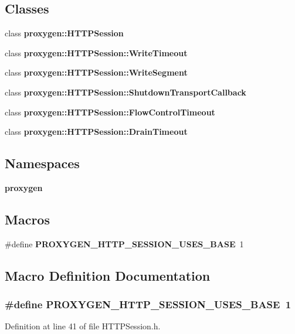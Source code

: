 \subsection*{Classes}
\begin{DoxyCompactItemize}
\item 
class {\bf proxygen\+::\+H\+T\+T\+P\+Session}
\item 
class {\bf proxygen\+::\+H\+T\+T\+P\+Session\+::\+Write\+Timeout}
\item 
class {\bf proxygen\+::\+H\+T\+T\+P\+Session\+::\+Write\+Segment}
\item 
class {\bf proxygen\+::\+H\+T\+T\+P\+Session\+::\+Shutdown\+Transport\+Callback}
\item 
class {\bf proxygen\+::\+H\+T\+T\+P\+Session\+::\+Flow\+Control\+Timeout}
\item 
class {\bf proxygen\+::\+H\+T\+T\+P\+Session\+::\+Drain\+Timeout}
\end{DoxyCompactItemize}
\subsection*{Namespaces}
\begin{DoxyCompactItemize}
\item 
 {\bf proxygen}
\end{DoxyCompactItemize}
\subsection*{Macros}
\begin{DoxyCompactItemize}
\item 
\#define {\bf P\+R\+O\+X\+Y\+G\+E\+N\+\_\+\+H\+T\+T\+P\+\_\+\+S\+E\+S\+S\+I\+O\+N\+\_\+\+U\+S\+E\+S\+\_\+\+B\+A\+SE}~1
\end{DoxyCompactItemize}


\subsection{Macro Definition Documentation}
\subsubsection[{P\+R\+O\+X\+Y\+G\+E\+N\+\_\+\+H\+T\+T\+P\+\_\+\+S\+E\+S\+S\+I\+O\+N\+\_\+\+U\+S\+E\+S\+\_\+\+B\+A\+SE}]{\setlength{\rightskip}{0pt plus 5cm}\#define P\+R\+O\+X\+Y\+G\+E\+N\+\_\+\+H\+T\+T\+P\+\_\+\+S\+E\+S\+S\+I\+O\+N\+\_\+\+U\+S\+E\+S\+\_\+\+B\+A\+SE~1}\label{HTTPSession_8h_a37f9d0f1b853b2ec2fa7666332d6a397}


Definition at line 41 of file H\+T\+T\+P\+Session.\+h.

